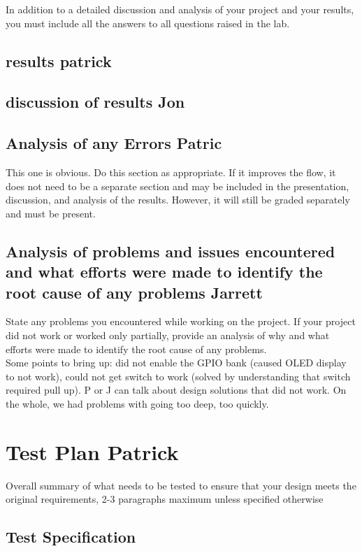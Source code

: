 \documentclass[12pt]{article} %
\begin{document}
In addition to a detailed discussion and analysis of your project and your results, you must include all the answers to all questions raised in the lab.
\subsection{results  patrick}

\subsection{discussion of results  Jon}

\subsection{Analysis of any Errors  Patric}

This one is obvious. Do this section as appropriate.  If it improves the flow, it does not need to be a separate section and may be included in the presentation, discussion, and analysis of the results.  However, it will still be graded separately and must be present.

\subsection{Analysis of problems and issues encountered and what efforts were made to identify the root cause of any problems  Jarrett}

State any problems you encountered while working on the project. If your project did not work or worked only partially, provide an analysis of why and what efforts were made to identify the root cause of any problems. \\

Some points to bring up: did not enable the GPIO bank (caused OLED display to not work), could not get switch to work (solved by understanding that switch required pull up). P or J can talk about design solutions that did not work. On the whole, we had problems with going too deep, too quickly.

\section{Test Plan Patrick}

Overall summary of what needs to be tested to ensure that your design meets the original requirements, 2-3 paragraphs maximum unless specified otherwise

\subsection{Test Specification}
\end{document}
